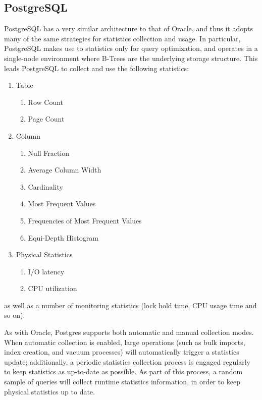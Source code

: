 \subsection{PostgreSQL}
PostgreSQL has a very similar architecture to that of Oracle, and thus it adopts many of the same strategies for statistics collection and usage. In particular, PostgreSQL makes use to statistics only for query optimization, and operates in a single-node environment where B-Trees are the underlying storage structure. This leads PostgreSQL to collect and use the following statistics\cite{PGCollector,PGStats,PGClass}:
\begin{enumerate}
				\item Table
								\begin{enumerate}
												\item Row Count
												\item Page Count
								\end{enumerate}
				\item Column
								\begin{enumerate}
												\item Null Fraction
												\item Average Column Width
												\item Cardinality
												\item Most Frequent Values
												\item Frequencies of Most Frequent Values
												\item Equi-Depth Histogram
								\end{enumerate}
				\item Physical Statistics
								\begin{enumerate}
												\item I/O latency
												\item CPU utilization
								\end{enumerate}
\end{enumerate}
as well as a number of monitoring statistics (lock hold time, CPU usage time and so on).

As with Oracle, Postgres supports both automatic and manual collection modes. When automatic collection is enabled, large operations (such as bulk imports, index creation, and vacuum processes) will automatically trigger a statistics update; additionally, a periodic statistics collection process is engaged regularly to keep statistics as up-to-date as possible. As part of this process, a random sample of queries will collect runtime statistics information, in order to keep physical statistics up to date. 

